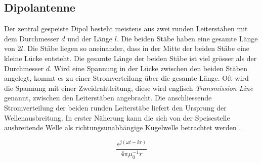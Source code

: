 \newpage
\subsection{Dipolantenne}\label{sec:DipolAntenne}
Der zentral gespeiste Dipol besteht meistens aus zwei runden Leiterstäben mit dem Durchmesser $d$ und der Länge $l$. Die beiden Stäbe haben eine gesamte Länge von $2l$. Die  Stäbe liegen so aneinander, dass in der Mitte der beiden Stäbe eine kleine Lücke entsteht. Die gesamte Länge der beiden Stäbe ist viel grösser als  der Durchmesser $d$. Wird eine Spannung  in der Lücke zwischen den beiden Stäben angelegt, kommt es zu einer Stromverteilung über die gesamte Länge. Oft wird die Spannung mit einer Zweidrahtleitung,  diese wird englisch \textit{Transmission Line} genannt, zwischen den Leiterstäben angebracht. Die anschliessende Stromverteilung der beiden runden Leiterstäbe liefert den Ursprung der Wellenausbreitung. In erster Näherung kann die sich von der Speisestelle ausbreitende Welle als richtungsunabhängige Kugelwelle betrachtet werden \cite{elliott1981antenna}.

\begin{equation}\label{term:Kugelwelle}
\frac{e^{j(\omega t-kr)}}{4\pi \mu_{0}^{-1}r}
\end{equation}

